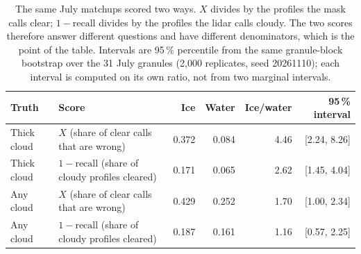 \begin{table}[!htbp]
\centering
\caption{The same July matchups scored two ways. $X$ divides by the profiles the mask calls clear; $1-\text{recall}$ divides by the profiles the lidar calls cloudy. The two scores therefore answer different questions and have different denominators, which is the point of the table. Intervals are 95\,\% percentile from the same granule-block bootstrap over the 31 July granules (2{,}000 replicates, seed 20261110); each interval is computed on its own ratio, not from two marginal intervals.}
\label{tab:metric}
\small
\begin{tabular}{@{}llrrrr@{}}
\toprule
Truth & Score & Ice & Water & Ice/water & 95\,\% interval \\
\midrule
Thick cloud & $X$ (share of clear calls that are wrong) & 0.372 & 0.084 & 4.46 & [2.24, 8.26] \\
Thick cloud & $1-\text{recall}$ (share of cloudy profiles cleared) & 0.171 & 0.065 & 2.62 & [1.45, 4.04] \\
Any cloud & $X$ (share of clear calls that are wrong) & 0.429 & 0.252 & 1.70 & [1.00, 2.34] \\
Any cloud & $1-\text{recall}$ (share of cloudy profiles cleared) & 0.187 & 0.161 & 1.16 & [0.57, 2.25] \\
\bottomrule
\end{tabular}
\end{table}

